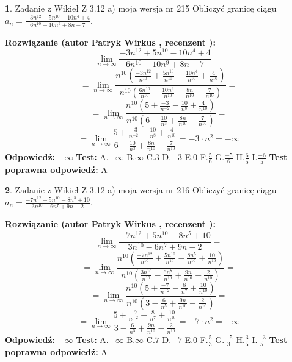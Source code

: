 \documentclass[12pt, a4paper]{article}
\theoremstyle{definition} %
\newtheorem{zad}{}
\newcommand{\zadStart}[1]{\begin{zad}#1\newline}
\newcommand{\zadStop}{\end{zad}}
\newcommand{\rozwStart}[2]{\noindent \textbf{Rozwiązanie (autor #1 , recenzent #2): }\newline}
\newcommand{\rozwStop}{\newline}
\newcommand{\odpStart}{\noindent \textbf{Odpowiedź:}\newline}
\newcommand{\odpStop}{\newline}
\newcommand{\testStart}{\noindent \textbf{Test:}\newline}
\newcommand{\testStop}{\newline}
\newcommand{\kluczStart}{\noindent \textbf{Test poprawna odpowiedź:}\newline}
\newcommand{\kluczStop}{\newline}
\begin{document}
\zadStart{Zadanie z Wikieł Z 3.12 a) moja wersja nr 215}
Obliczyć granicę ciągu $a_{n}=\frac{-3n^{12}+5n^{10}-10n^{4}+4}{6n^{10}-10n^{9}+8n-7}$.
\zadStop
\rozwStart{Patryk Wirkus}{}
$$\lim\limits_{n\to\infty}\frac{-3n^{12}+5n^{10}-10n^{4}+4}{6n^{10}-10n^{9}+8n-7}=$$
$$=\lim\limits_{n\to\infty}\frac{n^{10}\left(\frac{-3n^{12}}{n^{10}}+\frac{5n^{10}}{n^{10}}-\frac{10n^{4}}{n^{10}}+\frac{4}{n^{10}}\right)}{n^{10}\left(\frac{6n^{10}}{n^{10}}-\frac{10n^{9}}{n^{10}}+\frac{8n}{n^{10}}-\frac{7}{n^{10}}\right)}=$$
$$=\lim\limits_{n\to\infty}\frac{n^{10}\left(5+\frac{-3}{n^{-2}}-\frac{10}{n^{8}}+\frac{4}{n^{10}}\right)}
{n^{10}\left(6-\frac{10}{n^{3}}+\frac{8n}{n^{10}}-\frac{7}{n^{10}}\right)}=$$
$$=\lim\limits_{n\to\infty}\frac{5+\frac{-3}{n^{-2}}-\frac{10}{n^{8}}+\frac{4}{n^{10}}}{6-\frac{10}{n^{3}}+\frac{8n}{n^{10}}-\frac{7}{n^{10}}}=-3\cdot n^{2} = -\infty$$
\rozwStop
\odpStart
$-\infty$
\odpStop
\testStart
A.$-\infty$
B.$\infty$
C.$3$
D.$-3$
E.$0$
F.$\frac{5}{6}$
G.$\frac{-5}{6}$
H.$\frac{6}{5}$
I.$\frac{-6}{5}$
\testStop
\kluczStart
A
\kluczStop



\zadStart{Zadanie z Wikieł Z 3.12 a) moja wersja nr 216}
Obliczyć granicę ciągu $a_{n}=\frac{-7n^{12}+5n^{10}-8n^{5}+10}{3n^{10}-6n^{7}+9n-2}$.
\zadStop
\rozwStart{Patryk Wirkus}{}
$$\lim\limits_{n\to\infty}\frac{-7n^{12}+5n^{10}-8n^{5}+10}{3n^{10}-6n^{7}+9n-2}=$$
$$=\lim\limits_{n\to\infty}\frac{n^{10}\left(\frac{-7n^{12}}{n^{10}}+\frac{5n^{10}}{n^{10}}-\frac{8n^{5}}{n^{10}}+\frac{10}{n^{10}}\right)}{n^{10}\left(\frac{3n^{10}}{n^{10}}-\frac{6n^{7}}{n^{10}}+\frac{9n}{n^{10}}-\frac{2}{n^{10}}\right)}=$$
$$=\lim\limits_{n\to\infty}\frac{n^{10}\left(5+\frac{-7}{n^{-2}}-\frac{8}{n^{7}}+\frac{10}{n^{10}}\right)}
{n^{10}\left(3-\frac{6}{n^{5}}+\frac{9n}{n^{10}}-\frac{2}{n^{10}}\right)}=$$
$$=\lim\limits_{n\to\infty}\frac{5+\frac{-7}{n^{-2}}-\frac{8}{n^{7}}+\frac{10}{n^{10}}}{3-\frac{6}{n^{5}}+\frac{9n}{n^{10}}-\frac{2}{n^{10}}}=-7\cdot n^{2} = -\infty$$
\rozwStop
\odpStart
$-\infty$
\odpStop
\testStart
A.$-\infty$
B.$\infty$
C.$7$
D.$-7$
E.$0$
F.$\frac{5}{3}$
G.$\frac{-5}{3}$
H.$\frac{3}{5}$
I.$\frac{-3}{5}$
\testStop
\kluczStart
A
\kluczStop
\end{document}
